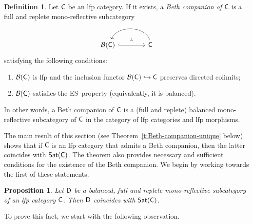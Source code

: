 \documentclass[a4paper,10pt,reqno]{amsart}
\newtheorem{proposition}[theorem]{Proposition}
\theoremstyle{definition}
\newtheorem{definition}[theorem]{Definition}
\theoremstyle{remark}
\newcommand{\cat}{{\sf C}}								%
\newcommand{\catt}{{\sf D}}								%
\newcommand{\B}[1]{\mathcal{B}(#1)}						%
\newcommand{\Sat}{{\sf Sat}}								%
\newcommand{\into}{\hookrightarrow}						%
\newcommand{\ES}{\textnormal{ES}}
\begin{document}
\begin{definition}\label{def:Beth-com}
Let $\cat$ be an lfp category. If it exists, a \emph{Beth companion of $\cat$} is a full and replete mono-reflective subcategory
\[\begin{tikzcd}[column sep=4em]
\B{\cat} \arrow[hookrightarrow]{r}[yshift=5pt]{\text{\tiny{$\bot$}}} & \cat \arrow[bend right=70,xshift=2pt]{l}
\end{tikzcd}\]
satisfying the following conditions:
\begin{enumerate}[label=(\alph*)]
\item $\B{\cat}$ is lfp and the inclusion functor $\B{\cat}\into \cat$ preserves directed colimits;
\item\label{i:ES-comp} $\B{\cat}$ satisfies the \ES~property (equivalently, it is balanced).
\end{enumerate}
\end{definition}
 
In other words, a Beth companion of $\cat$ is a (full and replete) balanced mono-reflective subcategory of $\cat$ in the category of lfp categories and lfp morphisms.

The main result of this section (see Theorem~\ref{t:Beth-companion-unique} below) shows that if $\cat$ is an lfp category that admits a Beth companion, then the latter coincides with $\Sat(\cat)$. The theorem also provides necessary and sufficient conditions for the existence of the Beth companion. We begin by working towards the first of these statements.

\begin{proposition}\label{p:saturated-Beth-comp-lfp}
Let $\catt$ be a balanced, full and replete mono-reflective subcategory of an lfp category $\cat$. Then $\catt$ coincides with $\Sat(\cat)$. 
\end{proposition}

To prove this fact, we start with the following observation.
\end{document}
